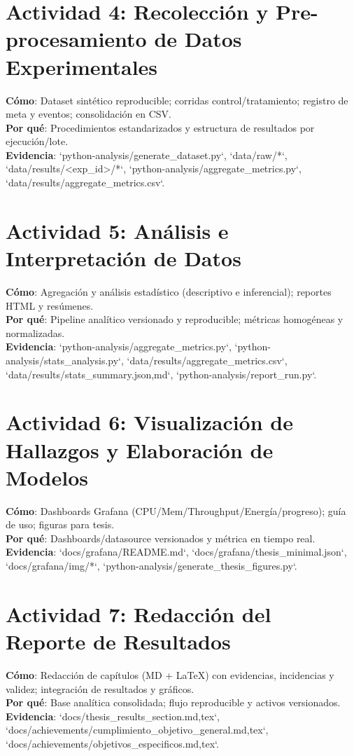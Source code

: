 \section{Actividad 4: Recolección y Pre-procesamiento de Datos Experimentales}
\textbf{Cómo}: Dataset sintético reproducible; corridas control/tratamiento; registro de meta y eventos; consolidación en CSV.\\
\textbf{Por qué}: Procedimientos estandarizados y estructura de resultados por ejecución/lote.\\
\textbf{Evidencia}: `python-analysis/generate_dataset.py`, `data/raw/*`, `data/results/<exp_id>/*`, `python-analysis/aggregate_metrics.py`, `data/results/aggregate_metrics.csv`.

\section{Actividad 5: Análisis e Interpretación de Datos}
\textbf{Cómo}: Agregación y análisis estadístico (descriptivo e inferencial); reportes HTML y resúmenes.\\
\textbf{Por qué}: Pipeline analítico versionado y reproducible; métricas homogéneas y normalizadas.\\
\textbf{Evidencia}: `python-analysis/aggregate_metrics.py`, `python-analysis/stats_analysis.py`, `data/results/aggregate_metrics.csv`, `data/results/stats_summary.{json,md}`, `python-analysis/report_run.py`.

\section{Actividad 6: Visualización de Hallazgos y Elaboración de Modelos}
\textbf{Cómo}: Dashboards Grafana (CPU/Mem/Throughput/Energía/progreso); guía de uso; figuras para tesis.\\
\textbf{Por qué}: Dashboards/datasource versionados y métrica en tiempo real.\\
\textbf{Evidencia}: `docs/grafana/README.md`, `docs/grafana/thesis_minimal.json`, `docs/grafana/img/*`, `python-analysis/generate_thesis_figures.py`.

\section{Actividad 7: Redacción del Reporte de Resultados}
\textbf{Cómo}: Redacción de capítulos (MD + LaTeX) con evidencias, incidencias y validez; integración de resultados y gráficos.\\
\textbf{Por qué}: Base analítica consolidada; flujo reproducible y activos versionados.\\
\textbf{Evidencia}: `docs/thesis_results_section.{md,tex}`, `docs/achievements/cumplimiento_objetivo_general.{md,tex}`, `docs/achievements/objetivos_especificos.{md,tex}`.

